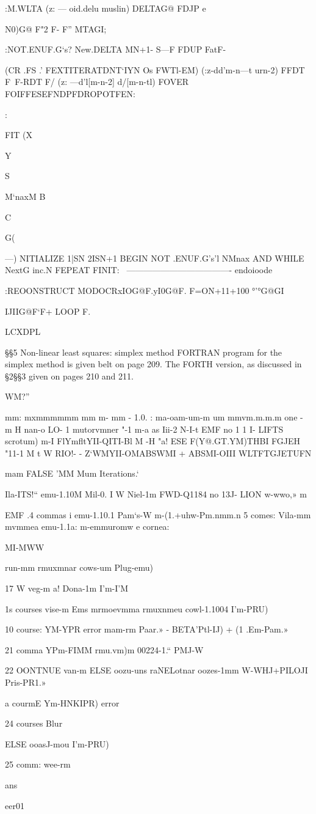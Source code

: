 :M.WLTA (z: — oid.delu muslin)
DELTAG@ FDJP e{N0)G@ F"2 F- F”
MTAGI;

:NOT.ENUF.G‘s? New.DELTA MN+1- S—F
FDUP FatF-

(CR .FS .' FEXTITERATDNT‘IYN Os FWTl-EM)
(:z-dd'm-n—t urn-2)
FFDT F\ F-RDT F/ (z: —d'l[m-n-2] d/[m-n-tl)
FOVER FOIFFESEFNDPFDROPOTFEN:

:}FIT (X{Y{S{ M‘naxM B{ C{G({ —)
NITIALIZE 1|SN 2ISN+1
BEGIN NOT .ENUF.G's’l NMnax AND
WHILE NextG inc.N
FEPEAT FINIT:
\ ------------------------------------- endoioode

:REOONSTRUCT MODOCRx{IO}G@F.y{I0}G@F.
F=ON+11+100
°{'°}G@GI{IJIIG@F‘F+
LOOP F.

LCXDPL

§§5 Non-linear least squares: simplex method
FORTRAN program for the simplex method is given belt
on page 209. The FORTH version, as discussed in §2§§3
given on pages 210 and 211.

WM?”

mm: mxmmmmmm
mm m- mm - 1.0.
: ma-oam-um-m
um mmvm.m.m.m
one - m H
nan-o
LO- 1
mutorvmner
"-1
m-a
as
Iii-2
N-I-t
EMF
no 1 1 I- LIFTS
scrotum) m-I
FlYmﬂtYII-QITI-Bl
M -H
"a!
ESE F(Y@.GT.YM)THBI
FGJEH "11-1
M
t W
RIO!- - Z‘WMYII-OMABSWMI + ABSMI-OIII
WLTFTGJETUFN

mam FALSE 'MM Mum Iterations.‘

Ila-ITS!“
emu-1.10M
Mil-0.
I W
Niel-1m
FWD-Q1184
no 13J- LION
w-wwo,»
m

EMF
.4 commas
i emu-1.10.1
Pam‘s-W
m-(1.+uhw-Pm.nmm.n
5 comes:
Vila-mm
mvmmea
emu-1.1a:
m-emmuromw
e cornea:

MI-MWW

 

run-mm
rmuxmnar
cows-um
Plug-emu)

17 W
veg-m
a!
Dona-1m
I’m-I'M

1s courses
vise-m
Ems
mrmoevmma
rmuxnmeu
cowl-1.1004
I’m-PRU)

10 course:
YM-YPR
error
mam-rm
Paar.» - BETA'Ptl-IJ) + (1 .Em-Pam.»

21 comma
YPm-FIMM
rmu.vm)m
00224-1.“
PMJ-W

22 OONTNUE
van-m
ELSE
oozu-uns
raNELotnar
oozes-1mm
W-WHJ+PILOJI
Pris-PR1.»

a courmE
Ym-HNKIPR)
error

24 courses
Blur

ELSE
ooasJ-mou
I’m-PRU)

25 comm:
wee-rm

ans

eer01

}}}}}}}
